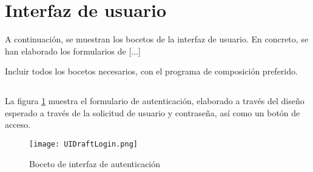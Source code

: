 \section{\forlnameref Interfaz de usuario}
\label{sec:userInterface}

A continuación, se muestran los bocetos de la interfaz de usuario. En concreto, se han elaborado los formularios de  [...]

\begin{shaded}
Incluir todos los bocetos necesarios, con el programa de composición preferido.
\end{shaded}

\subsection*{}
\label{sec:draftAutentication}

La figura \ref{fig:UIDraftLogin} muestra el formulario de autenticación, elaborado a través del diseño esperado a través de la solicitud de usuario y contraseña, así como un botón de acceso.

\begin{figure}[H]
\centering
\texttt{[image: UIDraftLogin.png]}
\caption{Boceto de interfaz de autenticación}
\label{fig:UIDraftLogin}
\end{figure}